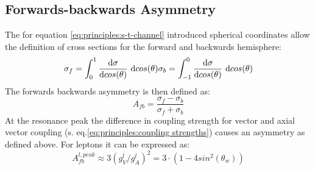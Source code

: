 \subsection{Forwards-backwards Asymmetry}
The for equation \ref{eq:principles:s-t-channel} introduced spherical coordinates allow the definition of cross sections for the forward and backwards hemisphere:
\begin{equation}
\sigma_f=\int_{0}^{1}\frac{\text{d}\sigma}{\text{d}cos(\theta)}~\text{d}cos(\theta) \\
\sigma_b=\int_{-1}^{0}\frac{\text{d}\sigma}{\text{d}cos(\theta)}~\text{d}cos(\theta)
\end{equation}
The forwards backwards asymmetry is then defined as:
\begin{equation}
A_{fb}=\frac{\sigma_f-\sigma_b}{\sigma_f+\sigma_b}
\label{eq:principles:asymmetry definition}
\end{equation}
At the resonance peak the difference in coupling strength for vector and axial vector coupling (s. eq.\ref{eq:principles:coupling strengths}) causes an asymmetry as defined above. For leptons it can be expressed as:
\begin{equation}
A_{fb}^{l,peak}\approx 3 (g^l_V/g^l_A)^2=3\cdot (1-4 sin^2(\theta_w))
\label{eq:principles:asymmetry weinberg angle}
\end{equation}